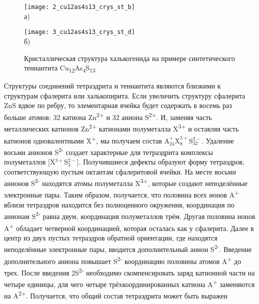 \begin{figure}[pt!]
  \begin{minipage}[ht]{0.99\linewidth}\centering
    \texttt{[image: 2\_cu12as4s13\_crys\_st\_b]} \\ а)
  \end{minipage}
  \vfill
  \begin{minipage}[ht]{0.99\linewidth}\centering
    \texttt{[image: 3\_cu12as4s13\_crys\_st\_d]} \\ б)
  \end{minipage}

      \caption[Кристаллическая структура халькогенида на примере синтетического теннантита Cu\textsubscript{12}As\textsubscript{4}S\textsubscript{13}]{Кристаллическая структура халькогенида на примере синтетического теннантита Cu\textsubscript{12}As\textsubscript{4}S\textsubscript{13}}
    \label{img:figure1}
\end{figure}

Структуры соединений тетраэдрита и теннантита являются близкими к структурам сфалерита или халькопирита\cite{Pauling1934}.
Если увеличить структуру сфалерита ZnS вдвое по ребру, то элементарная ячейка будет содержать в восемь раз больше атомов: 32 катиона Zn\textsuperscript{2+} и 32 аниона S\textsuperscript{2+}. И, заменяя часть металлических катионов Zn\textsuperscript{2+} катионами полуметалла X\textsuperscript{3+} и оставляя часть катионов одновалентными X\textsuperscript{+}, мы получаем состав A$^{+}_{24}$X$^{3+}_{8}$S$^{2-}_{32}$. Удаление восьми анионов S\textsuperscript{2-} создает характерные для тетраэдрита комплексы полуметаллов [X$^{3+}$S$^{2-}_{3}$]. Получившиеся дефекты образуют форму тетраэдров, соответствующую пустым октантам сфалеритовой ячейки. На месте восьми анионов S\textsuperscript{2-} находятся атомы полуметалла  X\textsuperscript{3+}, которые создают  неподелённые электронные пары. Таким образом, получается, что половина всех ионов A\textsuperscript{+} вблизи тетраэдров находится без полноценного окружения, координация по анионам S\textsuperscript{2-} равна двум, координация полуметаллов трём. Другая половина ионов A\textsuperscript{+} обладает четверной координацией, которая осталась как у сфалерита. Далее в центр из двух пустых тетраэдров обратной ориентации, где находятся неподелённые электронные пары, вводится дополнительный анион S\textsuperscript{2-}. Введение дополнительного аниона повышает S\textsuperscript{2-}  координацию половины атомов A\textsuperscript{+} до трех. После введения 2S\textsuperscript{2-} необходимо скомпенсировать заряд катионной части на четыре единицы, для чего четыре трёхкоординированных катиона A\textsuperscript{+} заменяются на A\textsuperscript{2+}. Получается, что общий состав тетраэдрита может быть выражен

